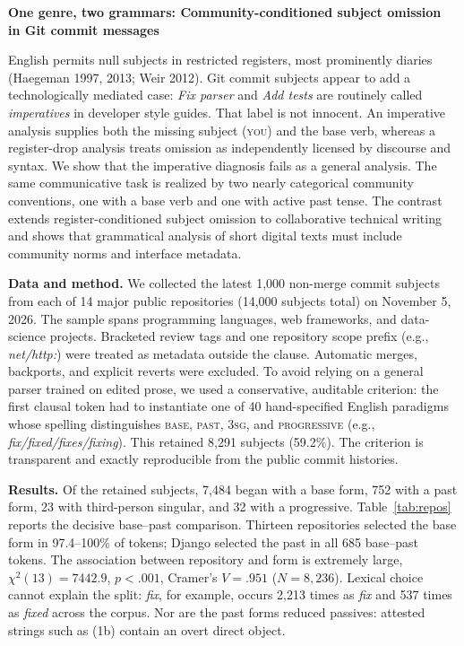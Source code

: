 \documentclass[12pt]{article}
\newcommand{\ex}[1]{\textit{#1}}
\begin{document}
\begin{center}
{\bfseries One genre, two grammars: Community-conditioned subject omission\\
in Git commit messages}
\end{center}
\vspace{-0.65em}

English permits null subjects in restricted registers, most prominently diaries
(Haegeman 1997, 2013; Weir 2012). Git commit subjects appear to add
a technologically mediated case: \ex{Fix parser} and \ex{Add tests} are routinely
called \emph{imperatives} in developer style guides. That label is not innocent.
An imperative analysis supplies both the missing subject (\textsc{you}) and the
base verb, whereas a register-drop analysis treats omission as independently
licensed by discourse and syntax. We show that the imperative diagnosis fails
as a general analysis. The same communicative task is realized by two nearly
categorical community conventions, one with a base verb and one with active
past tense. The contrast extends register-conditioned subject omission to
collaborative technical writing and shows that grammatical analysis of short
digital texts must include community norms and interface metadata.

\textbf{Data and method.}
We collected the latest 1,000 non-merge commit subjects from each of 14 major
public repositories (14,000 subjects total) on November 5, 2026. The sample
spans programming languages, web frameworks, and data-science projects.
Bracketed review tags and one repository scope prefix (e.g.,
\ex{net/http:}) were treated as metadata outside the clause. Automatic merges,
backports, and explicit reverts were excluded. To avoid relying on a general
parser trained on edited prose, we used a conservative, auditable
criterion: the first clausal token had to instantiate one of 40 hand-specified
English paradigms whose spelling distinguishes \textsc{base}, \textsc{past},
\textsc{3sg}, and \textsc{progressive} (e.g., \ex{fix/fixed/fixes/fixing}).
This retained 8,291 subjects (59.2\%). The criterion is transparent and exactly
reproducible from the public commit histories.

\textbf{Results.}
Of the retained subjects, 7,484 began with a base form, 752 with a past form,
23 with third-person singular, and 32 with a progressive. Table~\ref{tab:repos}
reports the decisive base--past comparison. Thirteen repositories selected the
base form in 97.4--100\% of tokens; Django selected the past in all 685
base--past tokens. The association between repository and form is extremely
large, $\chi^2(13)=7442.9$, $p<.001$, Cramer's $V=.951$ ($N=8{,}236$).
Lexical choice cannot explain the split: \textit{fix}, for example, occurs 2,213
times as \ex{fix} and 537 times as \ex{fixed} across the corpus. Nor are the
past forms reduced passives: attested strings such as (1b) contain an overt
direct object.
\end{document}
